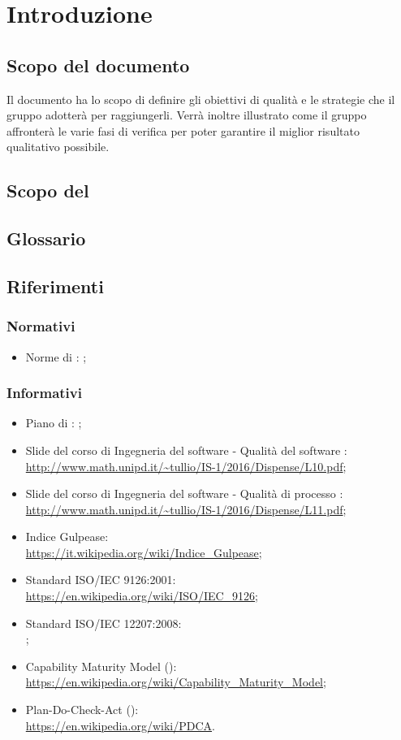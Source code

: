 \documentclass[PianoDiQualifica.tex]{subfiles}
\begin{document}
\section{Introduzione}
	\subsection{Scopo del documento}
		Il documento ha lo scopo di definire gli obiettivi di qualità e le strategie che il gruppo \GRUPPO{}
		adotterà per raggiungerli. Verrà inoltre illustrato come il gruppo affronterà le varie fasi di verifica
		per poter garantire il miglior risultato qualitativo possibile.
	\subsection{Scopo del }
		\SCOPO
	\subsection{Glossario}
		\GLOSSARIO
	\subsection{Riferimenti}
		\subsubsection{Normativi}
			\begin{itemize}
				\item Norme di : \NPdocRR{};
			\end{itemize}
		\subsubsection{Informativi}
			\begin{itemize}
				\item Piano di : \PPdocRR{};
				\item Slide del corso di Ingegneria del software - Qualità del software : \\
				\url{http://www.math.unipd.it/~tullio/IS-1/2016/Dispense/L10.pdf};
				\item Slide del corso di Ingegneria del software - Qualità di processo : \\
				\url{http://www.math.unipd.it/~tullio/IS-1/2016/Dispense/L11.pdf};
				\item Indice Gulpease: \\
				\url{https://it.wikipedia.org/wiki/Indice_Gulpease};
				\item Standard ISO/IEC 9126:2001: \\
				\url{https://en.wikipedia.org/wiki/ISO/IEC_9126};
				\item Standard ISO/IEC 12207:2008: \\
				\url{};
				\item Capability Maturity Model (): \\
				\url{https://en.wikipedia.org/wiki/Capability_Maturity_Model};
				\item Plan-Do-Check-Act (): \\
				\url{https://en.wikipedia.org/wiki/PDCA}.
			\end{itemize}
			
\end{document}
